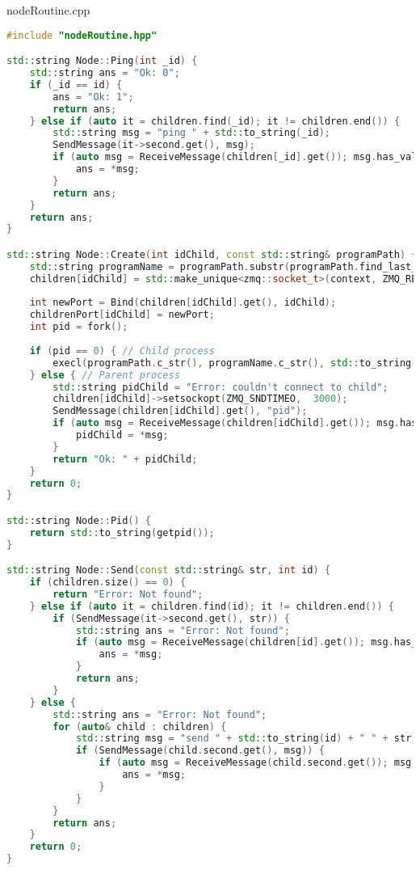 \documentclass[a4paper, 12pt]{article}
\begin{document}
nodeRoutine.cpp
\begin{lstlisting}[language=C++]
#include "nodeRoutine.hpp"

std::string Node::Ping(int _id) {
    std::string ans = "Ok: 0";
    if (_id == id) {
        ans = "Ok: 1";
        return ans;
    } else if (auto it = children.find(_id); it != children.end()) {
        std::string msg = "ping " + std::to_string(_id);
        SendMessage(it->second.get(), msg);          
        if (auto msg = ReceiveMessage(children[_id].get()); msg.has_value(), msg == "Ok: 1") {
            ans = *msg;
        }
        return ans;
    }
    return ans;
} 

std::string Node::Create(int idChild, const std::string& programPath) {
    std::string programName = programPath.substr(programPath.find_last_of("/") + 1);
    children[idChild] = std::make_unique<zmq::socket_t>(context, ZMQ_REQ);
    
    int newPort = Bind(children[idChild].get(), idChild);
    childrenPort[idChild] = newPort;
    int pid = fork();
    
    if (pid == 0) { // Child process
        execl(programPath.c_str(), programName.c_str(), std::to_string(idChild).c_str(), std::to_string(newPort).c_str(), nullptr);
    } else { // Parent process
        std::string pidChild = "Error: couldn't connect to child";
        children[idChild]->setsockopt(ZMQ_SNDTIMEO,  3000);
        SendMessage(children[idChild].get(), "pid");
        if (auto msg = ReceiveMessage(children[idChild].get()); msg.has_value()) {
            pidChild = *msg;
        }
        return "Ok: " + pidChild;
    }
    return 0;
}

std::string Node::Pid() {
    return std::to_string(getpid());
}

std::string Node::Send(const std::string& str, int id) {
    if (children.size() == 0) {
        return "Error: Not found";
    } else if (auto it = children.find(id); it != children.end()) {
        if (SendMessage(it->second.get(), str)) {
            std::string ans = "Error: Not found";
            if (auto msg = ReceiveMessage(children[id].get()); msg.has_value()) {
                ans = *msg;
            }
            return ans;
        }
    } else {
        std::string ans = "Error: Not found";
        for (auto& child : children) {
            std::string msg = "send " + std::to_string(id) + " " + str;
            if (SendMessage(child.second.get(), msg)) {
                if (auto msg = ReceiveMessage(child.second.get()); msg.has_value()) {
                    ans = *msg;
                }
            }
        }
        return ans;
    }
    return 0;
}


\end{lstlisting}
\end{document}
